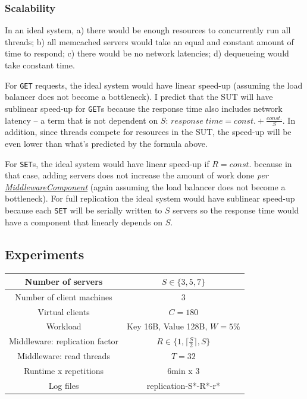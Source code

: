 \documentclass[11pt]{article}
\newcommand{\get}[0]{\texttt{GET}}
\newcommand{\set}[0]{\texttt{SET}}
\newcommand{\linkmain}[1]{\href{https://gitlab.inf.ethz.ch/pungast/asl-fall16-project/blob/master/src/main/java/asl/#1.java}{#1}}
\begin{document}
\subsubsection{Scalability}
\label{sec:exp2:hyp:scalability}

In an ideal system, a) there would be enough resources to concurrently run all threads; b) all memcached servers would take an equal and constant amount of time to respond; c) there would be no network latencies; d) dequeueing would take constant time.

For \get{} requests, the ideal system would have linear speed-up (assuming the load balancer does not become a bottleneck). I predict that the SUT will have sublinear speed-up for \get{}s because the response time also includes network latency -- a term that is not dependent on $S$: $response \; time = const. + \frac{const.}{S}$. In addition, since threads compete for resources in the SUT, the speed-up will be even lower than what's predicted by the formula above.

For \set{}s, the ideal system would have linear speed-up if $R=const.$ because in that case, adding servers does not increase the amount of work done \emph{per \linkmain{MiddlewareComponent}} (again assuming the load balancer does not become a bottleneck). For full replication the ideal system would have sublinear speed-up because each \set{} will be serially written to $S$ servers so the response time would have a component that linearly depends on $S$.

\subsection{Experiments}
\begin{center}
\small{
\smallskip
\begin{tabular}{|c|c|}
\hline Number of servers & $S \in \{3, 5, 7\}$ \\ 
\hline Number of client machines & 3 \\ 
\hline Virtual clients & $C=180$ \\ 
\hline Workload & Key 16B, Value 128B, $W=5\%$ \\
\hline Middleware: replication factor & $R \in \{1, \lceil\frac{S}{2}\rceil, S\}$ \\ 
\hline Middleware: read threads & $T=32$ \\ 
\hline Runtime x repetitions & 6min x 3 \\ 
\hline Log files & replication-S*-R*-r* \\
\hline 
\end{tabular} }
\end{center}
\end{document}
